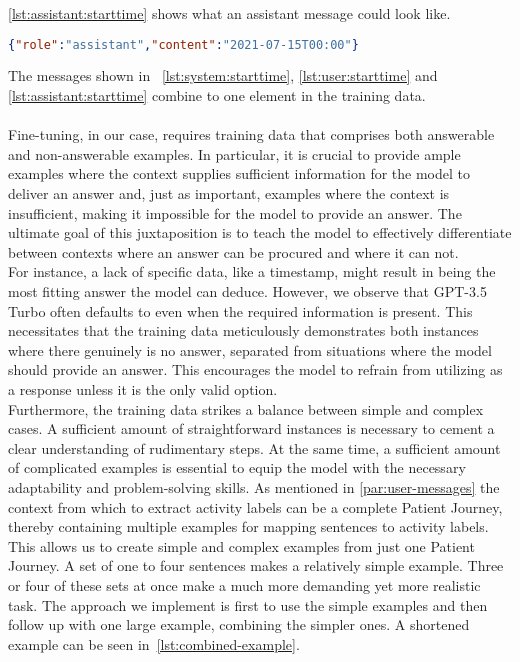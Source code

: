 \autoref{lst:assistant:starttime} shows what an assistant message could look like.
\begin{lstlisting}[language=json, caption={Assistant message for determining an activities start timestamp}, label={lst:assistant:starttime}, float=ht]
{"role":"assistant","content":"2021-07-15T00:00"}
\end{lstlisting}

The messages shown in ~\autoref{lst:system:starttime}, \ref{lst:user:starttime} and \ref{lst:assistant:starttime} combine to one element in the training data.\\\\

Fine-tuning, in our case, requires training data that comprises both answerable and non-answerable examples. In particular, it is crucial to provide ample examples where the context supplies sufficient information for the model to deliver an answer and, just as important, examples where the context is insufficient, making it impossible for the model to provide an answer. The ultimate goal of this juxtaposition is to teach the model to effectively differentiate between contexts where an answer can be procured and where it can not.\\
For instance, a lack of specific data, like a timestamp, might result in  being the most fitting answer the model can deduce. However, we observe that GPT-3.5 Turbo often defaults to  even when the required information is present. This necessitates that the training data meticulously demonstrates both instances where there genuinely is no answer, separated from situations where the model should provide an answer. This encourages the model to refrain from utilizing  as a response unless it is the only valid option.\\
Furthermore, the training data strikes a balance between simple and complex cases. A sufficient amount of straightforward instances is necessary to cement a clear understanding of rudimentary steps. At the same time, a sufficient amount of complicated examples is essential to equip the model with the necessary adaptability and problem-solving skills. As mentioned in \ref{par:user-messages} the context from which to extract activity labels can be a complete Patient Journey, thereby containing multiple examples for mapping sentences to activity labels. This allows us to create simple and complex examples from just one Patient Journey. A set of one to four sentences makes a relatively simple example. Three or four of these sets at once make a much more demanding yet more realistic task. The approach we implement is first to use the simple examples and then follow up with one large example, combining the simpler ones. A shortened example can be seen in~\autoref{lst:combined-example}.
